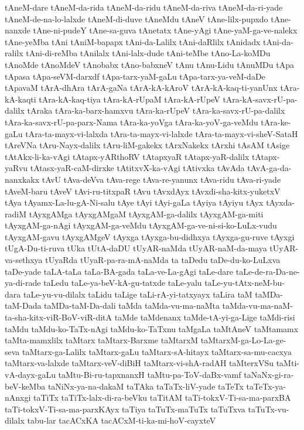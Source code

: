 {tAneM-dare
tAneM-da-rida
tAneM-da-ridu
tAneM-da-riva
tAneM-da-ri-yade
tAneM-de-na-lo-lalxde
tAneM-di-duve
tAneMdu
tAneV
tAne-lilx-pupxdo
tAne-nanxde
tAne-ni-pudeY
tAne-sa-guva
tAnetatx
tAne-yAgi
tAne-yaM-ga-ve-nalekx
tAne-yeMba
tAni
tAniM-bapapx
tAni-da-Lalilx
tAni-daRlilx
tAnidadx
tAni-da-ralilx
tAni-di-reMba
tAnilalx
tAni-lalx-dude
tAni-teMbe
tAno-La-koMDu
tAnoMde
tAnoMdeV
tAnobabx
tAno-babxneV
tAnu
tAnu-Lidu
tAnuMDu
tApa
tApasa
tApa-seVM-darxdf
tApa-tarx-yaM-gaLu
tApa-tarx-ya-veM-daDe
tApavaM
tArA-dhAra
tArA-gaNa
tArA-kA-kAroV
tArA-kA-kaq-ti-yanUnx
tAra-kA-kaqti
tAra-kA-kaq-tiya
tAra-kA-rUpaM
tAra-kA-rUpeV
tAra-kA-savx-rU-pa-dalilx
tAraka
tAra-ka-barx-hamxvu
tAra-ka-rUpeV
tAra-ka-savx-rU-pa-dalilx
tAra-ka-savx-rU-pa-parx-Nama
tAra-ka-yoVga
tAra-ka-yoV-ga-veMdu
tAra-ke-gaLu
tAra-ta-mayx-vi-lalxda
tAra-ta-mayx-vi-lalxde
tAra-ta-mayx-vi-sheV-SataH
tAreVNa
tAru-Nayx-dalilx
tAru-liM-gakekx
tArxNakekx
tArxhi
tAsAM
tAsige
tAtAkx-li-ka-vAgi
tAtapx-yARthoRV
tAtapxyaR
tAtapx-yaR-dalilx
tAtapx-yaRvu
tAtasx-yaR-caM-dirxke
tAtitxvX-ka-vAgi
tAtivxka
tAvAda
tAvA-ga-da-nanxkakx
tAvU
tAva-deVva
tAva-rege
tAva-re-yanunx
tAva-ridu
tAva-ri-yade
tAveM-baru
tAveV
tAvi-ru-titxpaR
tAvu
tAvxdAyx
tAvxdi-sha-kitx-yuketxV
tAya
tAyamx-La-lu-gA-Ni-salu
tAye
tAyi
tAyi-gaLa
tAyiya
tAyiyu
tAyx
tAyxda-radiM
tAyxgAMga
tAyxgAMgaM
tAyxgAM-ga-dalilx
tAyxgAM-ga-miti
tAyxgAM-ga-nAgi
tAyxgAM-ga-veMdu
tAyxgAM-ga-ve-ni-si-ko-LuLx-vudu
tAyxgAM-gavu
tAyxgAMgeV
tAyxga
tAyxga-bu-didhxya
tAyxga-gu-ruve
tAyxgi
tUgA-Du-ti-ruva
tUka
tUtA-daDU
tUyAR-naMda
tUyAR-naM-da-maya
tUyAR-va-sethxya
tUyaRda
tUyaR-pa-ra-mA-naMda
ta
taDedu
taDe-du-ko-LuLxva
taDe-yade
taLA-taLa
taLa-BA-gada
taLa-ve-La-gAgi
taLe-dare
taLe-de-ra-Da-ne-ya-di-rade
taLedu
taLe-ya-beV-kA-gu-tatxde
taLe-yalu
taLe-yu-tAtx-neM-bu-dara
taLe-yu-vu-dilalx
taLidu
taLige
taLi-rA-yi-tatxyayx
taLira
taM
taMDa-taM-Dada
taMDa-taM-Da-dali
taMda
taMda-vu-ma-naMta
taMda-vu-ma-naM-ta-sha-kitx-viR-BoV-viR-ditA
taMde
taMdenanx
taMde-tA-yi-ga-Lige
taMdi-risi
taMdu
taMdu-ko-TaTx-nAgi
taMdu-ko-TaTxnu
taMgaLa
taMtAneV
taMtamamx
taMta-mamxlilx
taMtarx
taMtarx-Barxme
taMtarxM
taMtarxM-ga-Lo-La-ge-seva
taMtarx-ga-Lalilx
taMtarx-gaLu
taMtarx-sA-hitayx
taMtarx-sa-mu-cacxya
taMtarx-va-lalxde
taMtarx-veV-diBiH
taMtarx-vi-shA-radAH
taMterxVSu
taMti-vA-dayx-gaLu
taMtu-Bi-ru-tapxnanxH
taMtu-pa-ToV-daBx-vamf
taNaNx-gi-ra-beV-keMba
taNiNx-ya-na-dakaM
taTAka
taTaTx-liV-yade
taTeTx
taTeTx-ya-nAnxgi
taTiTx
taTiTx-lalx-di-ra-beVku
taTitAM
taTi-tokxV-Ti-sa-ma-parxBA
taTi-tokxV-Ti-sa-ma-parxKAyx
taTiya
taTuTx-maTuTx
taTuTxva
taTuTx-vu-dilalx
tabu-lar
tacACxKA
tacACxM-ti-ka-mi-hoV-cayxteV
}
